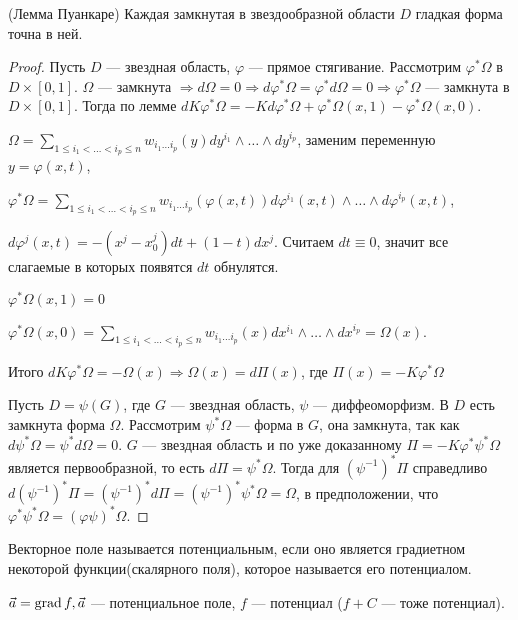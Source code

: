 \begin{theorem}(Лемма Пуанкаре)
	Каждая замкнутая в звездообразной области $D$ гладкая форма точна в ней.
\end{theorem}

\begin{proof}
	Пусть $D$ --- звездная область, $\varphi$ --- прямое стягивание. Рассмотрим $\varphi^*\Omega$ в $D\times[0,1]$. $\Omega$ --- замкнута $\Rightarrow d\Omega=0\Rightarrow d\varphi^*\Omega=\varphi^*d\Omega=0\Rightarrow \varphi^*\Omega$ --- замкнута в $D\times[0,1]$. Тогда по лемме $dK\varphi^*\Omega=-Kd\varphi^*\Omega+\varphi^*\Omega(x,1)-\varphi^*\Omega(x,0)$.
	
	$\Omega=\sum\limits_{1\leqslant i_1 < \ldots < i_p \leqslant n}w_{i_1\ldots i_p}(y)dy^{i_1}\wedge\ldots\wedge dy^{i_p}$, заменим переменную $y=\varphi(x,t)$,
	
	$\varphi^*\Omega=\sum\limits_{1\leqslant i_1 < \ldots < i_p \leqslant n} w_{i_1\ldots i_p}(\varphi(x,t))d\varphi^{i_1}(x,t)\wedge\ldots\wedge d\varphi^{i_p}(x,t)$,
	
	$d\varphi^{j}(x,t)=-(x^j-x_0^j)dt+(1-t)dx^j$. Считаем $dt\equiv0$, значит все слагаемые в которых появятся $dt$ обнулятся.
	
	$\varphi^*\Omega(x,1) =0$
	
	$\varphi^*\Omega(x,0)=\sum\limits_{1\leqslant i_1 < \ldots < i_p \leqslant n}w_{i_1\ldots i_p}(x)dx^{i_1}\wedge\ldots\wedge dx^{i_p}=\Omega(x)$. 
	
	Итого $dK\varphi^*\Omega=-\Omega(x)\Rightarrow \Omega(x)=d\Pi(x)$, где $\Pi(x)=-K\varphi^*\Omega$
	
	Пусть $D=\psi(G)$, где $G$ --- звездная область, $\psi$ --- диффеоморфизм. В $D$ есть замкнута форма $\Omega$. Рассмотрим $\psi^*\Omega$ --- форма в $G$, она замкнута, так как $d\psi^*\Omega=\psi^*d\Omega=0$. $G$ --- звездная область и по уже доказанному $\Pi=-K\varphi^*\psi^*\Omega$ является первообразной, то есть $d\Pi=\psi^*\Omega$. Тогда для $(\psi^{-1})^*\Pi$ справедливо $d(\psi^{-1})^*\Pi=(\psi^{-1})^*d\Pi=(\psi^{-1})^*\psi^*\Omega=\Omega$, в предположении, что $\varphi^*\psi^*\Omega=(\varphi\psi)^*\Omega$.
\end{proof}

\begin{Def}
	Векторное поле называется потенциальным, если оно является градиетном некоторой функции(скалярного поля), которое называется его потенциалом.
	
	$\vec{a}=\operatorname{grad} f, \vec{a}$ --- потенциальное поле, $f$ --- потенциал ($f+C$ --- тоже потенциал).
\end{Def}

